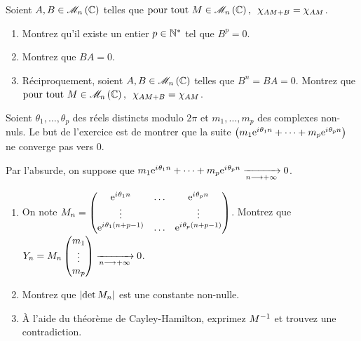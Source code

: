 \begin{exo}
Soient \(A,B\in\M{n}[\C]\) telles que \(\quantifs{\tpt M\in\M{n}[\C]}\chi_{AM+B}=\chi_{AM}\).

\begin{enumerate}
    \item Montrez qu'il existe un entier \(p\in\mathbb{N}^*\) tel que \(B^p=0\). \\
    \item Montrez que \(BA=0\). \\
    \item Réciproquement, soient \(A,B\in\M{n}[\C]\) telles que \(B^n=BA=0\). Montrez que \(\quantifs{\tpt M\in\M{n}[\C]}\chi_{AM+B}=\chi_{AM}\).
\end{enumerate}
\end{exo}



\begin{exo}
Soient \(\theta_1,\dots,\theta_p\) des réels distincts modulo \(2\pi\) et \(m_1,\dots,m_p\) des complexes non-nuls. Le but de l'exercice est de montrer que la suite \(\left(m_1\mathrm{e}^{i\mkern1mu\theta_1n}+\dots+m_p\mathrm{e}^{i\mkern1mu\theta_pn}\right)\) ne converge pas vers \(0\).

Par l'absurde, on suppose que \(m_1\mathrm{e}^{i\mkern1mu\theta_1n}+\dots+m_p\mathrm{e}^{i\mkern1mu\theta_pn}\xrightarrow[n\longrightarrow+\infty]{}0\).

\begin{enumerate}
    \item On note \(M_n=\begin{pmatrix}
        \mathrm{e}^{i\mkern1mu\theta_1n} & \dots & \mathrm{e}^{i\mkern1mu\theta_pn} \\
        \vdots &  & \vdots \\
        \mathrm{e}^{i\mkern1mu\theta_1\left(n+p-1\right)} & \dots & \mathrm{e}^{i\mkern1mu\theta_p\left(n+p-1\right)}
    \end{pmatrix}\). Montrez que \(Y_n=M_n\begin{pmatrix}m_1\\\vdots\\m_p\end{pmatrix}\xrightarrow[n\longrightarrow+\infty]{}0\). \\
    \item Montrez que \(\left\lvert\det M_n\right\rvert\) est une constante non-nulle. \\
    \item À l'aide du théorème de Cayley-Hamilton, exprimez \(M^{-1}\) et trouvez une contradiction.
\end{enumerate}
\end{exo}




